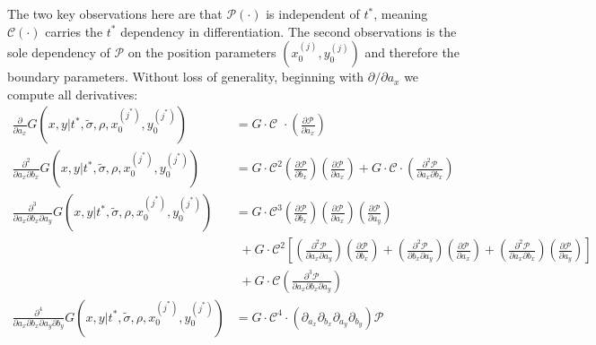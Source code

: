 \documentclass[10pt]{article}
\begin{document}
The two key observations here are that $\mathcal{P}(\cdot)$ is
independent of $t^{*}$, meaning $\mathcal{C}(\cdot)$ carries the
$t^{*}$ dependency in differentiation. The second observations is the
sole dependency of $\mathcal{P}$ on the position parameters
$(x_0^{(j)}, y_0^{(j)})$ and therefore the boundary
parameters. Without loss of generality, beginning with
$\partial/\partial a_x$ we compute all derivatives:
\begin{align}
  \frac{\partial}{\partial a_x} G(x,y|t^{*}, \tilde{\sigma}, \rho, x_0^{(j^*)}, y_0^{(j^*)}) &= G \cdot \mathcal{C}\,\,\cdot \left( \frac{\partial \mathcal{P}}{\partial a_x} \right)\\
  \frac{\partial^2}{\partial a_x \partial b_x} G(x,y|t^{*}, \tilde{\sigma}, \rho, x_0^{(j^*)}, y_0^{(j^*)}) &= G \cdot \mathcal{C}^2 \left( \frac{\partial \mathcal{P}}{\partial b_x} \right) \left( \frac{\partial \mathcal{P}}{\partial a_x} \right) + G \cdot \mathcal{C} \cdot \left( \frac{\partial^2 \mathcal{P}}{\partial a_x \partial b_x} \right) \\
  \frac{\partial^3}{\partial a_x \partial b_x \partial a_y} G(x,y|t^{*}, \tilde{\sigma}, \rho, x_0^{(j^*)}, y_0^{(j^*)}) &= G \cdot \mathcal{C}^3 \left( \frac{\partial \mathcal{P}}{\partial b_x} \right) \left( \frac{\partial \mathcal{P}}{\partial a_x} \right) \left( \frac{\partial \mathcal{P}}{\partial a_y} \right) \nonumber \\
                                                                                             &\,\, + G \cdot \mathcal{C}^2 \left[\left( \frac{\partial^2 \mathcal{P}}{\partial a_x \partial a_y} \right) \left( \frac{\partial \mathcal{P}}{\partial b_x} \right) + \left( \frac{\partial^2 \mathcal{P}}{\partial b_x \partial a_y} \right) \left( \frac{\partial \mathcal{P}}{\partial a_x} \right) + \left( \frac{\partial^2 \mathcal{P}}{\partial a_x \partial b_x} \right) \left( \frac{\partial \mathcal{P}}{\partial a_y} \right)\right] \nonumber \\
                                                                                             &\,\, + G \cdot \mathcal{C} \left( \frac{\partial^3 \mathcal{P}}{\partial a_x \partial b_x \partial a_y} \right) \nonumber \\
  \frac{\partial^4}{\partial a_x \partial b_x \partial a_y \partial b_y} G(x,y|t^{*}, \tilde{\sigma}, \rho, x_0^{(j^*)}, y_0^{(j^*)}) &= G \cdot \mathcal{C}^4 \cdot \left(\partial_{a_x}\partial_{b_x} \partial_{a_y}\partial_{b_y} \right)\mathcal{P} \nonumber \\

\end{align}
\end{document}

